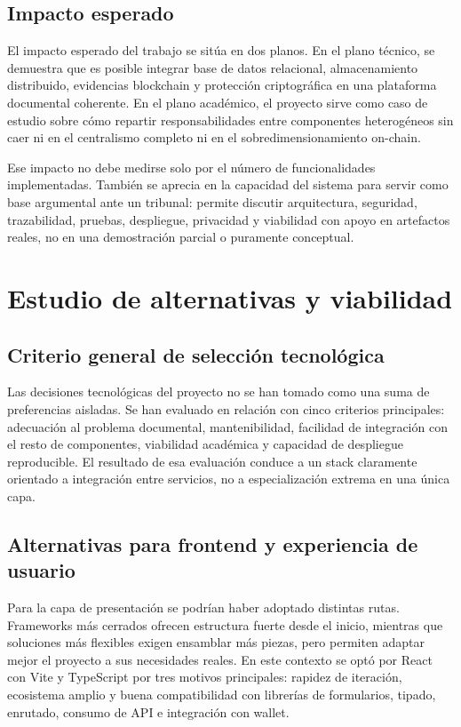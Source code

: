 \documentclass[11pt, a4paper]{article}
\begin{document}
\subsection{Impacto esperado}

El impacto esperado del trabajo se sitúa en dos planos. En el plano técnico, se demuestra que es posible integrar base de datos relacional, almacenamiento distribuido, evidencias blockchain y protección criptográfica en una plataforma documental coherente. En el plano académico, el proyecto sirve como caso de estudio sobre cómo repartir responsabilidades entre componentes heterogéneos sin caer ni en el centralismo completo ni en el sobredimensionamiento on-chain.

Ese impacto no debe medirse solo por el número de funcionalidades implementadas. También se aprecia en la capacidad del sistema para servir como base argumental ante un tribunal: permite discutir arquitectura, seguridad, trazabilidad, pruebas, despliegue, privacidad y viabilidad con apoyo en artefactos reales, no en una demostración parcial o puramente conceptual.

\section{Estudio de alternativas y viabilidad}

\subsection{Criterio general de selección tecnológica}

Las decisiones tecnológicas del proyecto no se han tomado como una suma de preferencias aisladas. Se han evaluado en relación con cinco criterios principales: adecuación al problema documental, mantenibilidad, facilidad de integración con el resto de componentes, viabilidad académica y capacidad de despliegue reproducible. El resultado de esa evaluación conduce a un stack claramente orientado a integración entre servicios, no a especialización extrema en una única capa.

\subsection{Alternativas para frontend y experiencia de usuario}

Para la capa de presentación se podrían haber adoptado distintas rutas. Frameworks más cerrados ofrecen estructura fuerte desde el inicio, mientras que soluciones más flexibles exigen ensamblar más piezas, pero permiten adaptar mejor el proyecto a sus necesidades reales. En este contexto se optó por React con Vite y TypeScript por tres motivos principales: rapidez de iteración, ecosistema amplio y buena compatibilidad con librerías de formularios, tipado, enrutado, consumo de API e integración con wallet.
\end{document}
